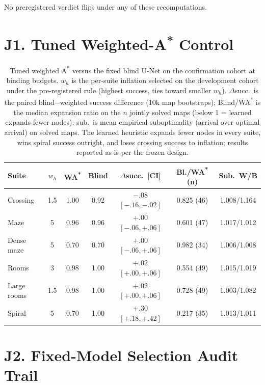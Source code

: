 \documentclass[letterpaper]{article} %
\begin{document}
No preregistered verdict flips under any of these recomputations.

\section{J1. Tuned Weighted-A\textsuperscript{*} Control}

\begin{table}[h]
\centering
\scriptsize
\setlength{\tabcolsep}{2.2pt}
\begin{tabular}{@{}lcccccc@{}}
\toprule
Suite & $w_h$ & WA\textsuperscript{*} & Blind & $\Delta$succ.\ [CI] & Bl./WA\textsuperscript{*} (n) & Sub.\ W/B \\
\midrule
Crossing & 1.5 & 1.00 & 0.92 & $-.08$ $[-.16,-.02]$ & 0.825 (46) & 1.008/1.164 \\
Maze & 5 & 0.96 & 0.96 & $+.00$ $[-.06,+.06]$ & 0.601 (47) & 1.017/1.012 \\
Dense maze & 5 & 0.70 & 0.70 & $+.00$ $[-.06,+.06]$ & 0.982 (34) & 1.006/1.008 \\
Rooms & 3 & 0.98 & 1.00 & $+.02$ $[+.00,+.06]$ & 0.554 (49) & 1.015/1.019 \\
Large rooms & 1.5 & 0.98 & 1.00 & $+.02$ $[+.00,+.06]$ & 0.728 (49) & 1.003/1.082 \\
Spiral & 5 & 0.70 & 1.00 & $+.30$ $[+.18,+.42]$ & 0.217 (35) & 1.013/1.011 \\
\bottomrule
\end{tabular}
\caption{Tuned weighted A\textsuperscript{*} versus the fixed blind U-Net on the confirmation cohort at binding budgets. $w_h$ is the per-suite inflation selected on the development cohort under the pre-registered rule (highest success, ties toward smaller $w_h$). $\Delta$succ.\ is the paired blind$-$weighted success difference (10k map bootstraps); Blind/WA\textsuperscript{*} is the median expansion ratio on the $n$ jointly solved maps (below 1 = learned expands fewer nodes); sub.\ is mean empirical suboptimality (arrival over optimal arrival) on solved maps. The learned heuristic expands fewer nodes in every suite, wins spiral success outright, and loses crossing success to inflation; results reported as-is per the frozen design.}
\label{tab:wastar}
\end{table}

\section{J2. Fixed-Model Selection Audit Trail}
\end{document}
